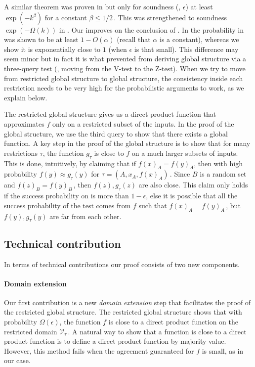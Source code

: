 \documentclass{toc}
\newcommand\f{f} %
\newcommand\pf{g} %
\newcommand\cons{\mathcal{V}} %
\begin{document}
%
A similar theorem was proven in \cite{impagliazzo2012new} but only for soundness (\ie, $\epsilon$) at least $\exp(-k^\beta)$ for a constant $\beta \leq1/2$\,.
%
%
This was strengthened to soundness $\exp(-\Omega(k))$ in \cite{dinur2014direct}. Our  improves on the conclusion of \cite{dinur2014direct}. In \cite{dinur2014direct} the probability in  was shown to be at least $1-O(\alpha)$ 
(recall that $\alpha$ is a constant), %
%
%
whereas we show it is exponentially close to $1$ (when $\epsilon$ is that small).
This difference may seem minor but in fact it is what prevented \cite{dinur2014direct} from deriving global structure via a %
three-query   %
test (\ie, moving from the %
V-test to the Z-test). %
When we try to move from restricted global structure to global structure, the consistency inside each restriction needs to be very high for the probabilistic arguments to work, as we explain below.

The restricted global structure gives us a direct product function that approximates $\f$ only on a restricted subset of the inputs. In the proof of the global structure, we use the third query to show that there exists a global function. A key step in the proof of the global structure is to show that for many restrictions $\tau$, the function $\pf_\tau$ is close to $\f$ on a much larger subsets of inputs. This is done, intuitively, by claiming that if $\f(x)_A = \f(y)_A$, then with high probability $\f(y)\approx \pf_\tau(y)$ for $\tau=(A,x_A,\f(x)_A)$\,. Since $B$ is a random set and $\f(z)_B = \f(y)_B$\,, then $\f(z), \pf_\tau(z)$ are also close. This claim only holds if the success probability on  is more than $1-\epsilon$, else it is possible that all the success probability of the test comes from $f$ such that $\f(x)_A = \f(y)_A$\,, but $\f(y),\pf_\tau(y)$ are far from each other.


\subsection{Technical contribution}
In terms of technical contributions our proof consists of two new components.

\paragraph*{Domain extension} Our first contribution is a new \emph{domain extension} step that facilitates the proof of the restricted global structure. The restricted global structure shows that with probability $\Omega(\epsilon)$, the function $\f$ is close to a direct product function on the restricted domain $\cons_\tau$\,. A natural way to show that a function is close to a direct product function is to define a direct product function by majority value. However, this method fails when the agreement guaranteed for $\f$ is small, as in our case.
\end{document}
